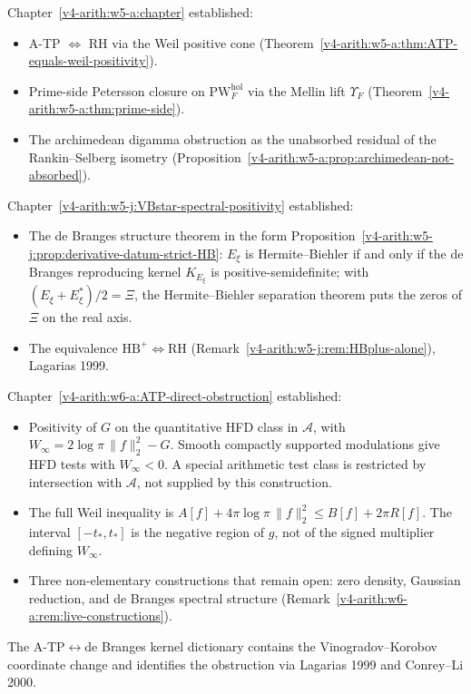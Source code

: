 Chapter~\ref{v4-arith:w5-a:chapter} established:
\begin{itemize}
\item A-TP \(\Leftrightarrow\) RH via the Weil positive cone
(Theorem~\ref{v4-arith:w5-a:thm:ATP-equals-weil-positivity}).
\item Prime-side Petersson closure on
\(\mathrm{PW}^{\mathrm{hol}}_{F}\) via the Mellin lift
\(\Upsilon_{F}\) (Theorem~\ref{v4-arith:w5-a:thm:prime-side}).
\item The archimedean digamma obstruction as the unabsorbed residual
of the Rankin--Selberg isometry
(Proposition~\ref{v4-arith:w5-a:prop:archimedean-not-absorbed}).
\end{itemize}
Chapter~\ref{v4-arith:w5-j:VBstar-spectral-positivity} established:
\begin{itemize}
\item The de Branges structure theorem in the form
Proposition~\ref{v4-arith:w5-j:prop:derivative-datum-strict-HB}: \(E_{\xi}\) is
Hermite--Biehler if and only if the de Branges reproducing kernel
\(K_{E_{\xi}}\) is positive-semidefinite; with
\((E_{\xi}+E_{\xi}^{*})/2=\Xi\), the Hermite--Biehler separation
theorem puts the zeros of \(\Xi\) on the real axis.
\item The equivalence \(\mathrm{HB}^{+}\Leftrightarrow\mathrm{RH}\)
(Remark~\ref{v4-arith:w5-j:rem:HBplus-alone}), Lagarias 1999.
\end{itemize}
Chapter~\ref{v4-arith:w6-a:ATP-direct-obstruction} established:
\begin{itemize}
\item Positivity of \(G\) on the quantitative HFD class in
\(\mathscr A\), with \(W_\infty=2\log\pi\,\|f\|_2^2-G\).
Smooth compactly supported modulations give HFD tests with
\(W_\infty<0\). A special arithmetic test class is restricted by
intersection with \(\mathscr A\), not supplied by this construction.
\item The full Weil inequality is
\(A[f]+4\pi\log\pi\,\|f\|_2^2\leq B[f]+2\pi R[f]\).
The interval \([-t_*,t_*]\) is the negative region of \(g\), not
of the signed multiplier defining \(W_\infty\).
\item Three non-elementary constructions that remain open: zero density,
Gaussian reduction, and de Branges spectral structure
(Remark~\ref{v4-arith:w6-a:rem:live-constructions}).
\end{itemize}

The A-TP\(\leftrightarrow\)de Branges kernel dictionary contains the
Vinogradov--Korobov coordinate change and identifies the obstruction
via Lagarias 1999 and Conrey--Li 2000.


